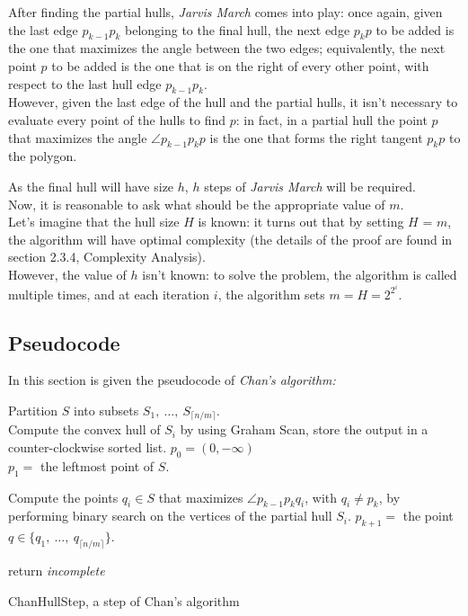 \documentclass[
12pt,
a4paper,
oneside,
headinclude,
footinclude]{report}
\theoremstyle{definition} %
\begin{document}
After finding the partial hulls, \textit{Jarvis March} comes into play:
once again, given the last edge $p_{k-1}p_k$ belonging to the final hull, the next edge $p_kp$ to be added is the one that maximizes the angle between the two edges; equivalently, the next point $p$ to be added is the one that is on the right of every other point, with respect to the last hull edge $p_{k-1}p_k$.\\
However, given the last edge of the hull and the partial hulls, it isn't necessary to evaluate every point of the hulls to find $p$: in fact, in a partial hull the point $p$ that maximizes the angle $\angle p_{k-1}p_kp$ is the one that forms the right tangent $p_kp$ to the polygon.

As the final hull will have size $h$, $h$ steps of \textit{Jarvis March} will be required.\\

Now, it is reasonable to ask what should be the appropriate value of $m$. \\
Let's imagine that the hull size $H$ is known: it turns out that by setting $H$ = $m$, the algorithm will have optimal complexity (the details of the proof are found in section 2.3.4, Complexity Analysis).\\ However, the value of $h$ isn't known: to solve the problem, the algorithm is called multiple times, and at each iteration $i$, the algorithm sets $m = H = 2^{2^i}$.


\subsection{Pseudocode}
In this section is given the pseudocode of \textit{Chan's algorithm:} \cite{Chan1996}\\


\begin{algorithm}[H]
	\DontPrintSemicolon
	\SetAlgoVlined
	Partition $S$ into subsets $S_1,\ \ldots,\ S_{\lceil n/m \rceil}$.\\
	{
		Compute the convex hull of $S_i$ by using Graham Scan, store the output in a counter-clockwise sorted list.
	}  
	$p_0 = (0, -\infty)$\\
	$p_1 =$ the leftmost point of $S$.
	
	{
		{
			Compute the points $q_i \in S$ that maximizes $\angle p_{k-1}p_kq_i$, with $q_i \ne p_k$, by performing binary search on the vertices of the partial hull $S_i$.
		}
		$p_{k+1} = $ the point $q \in \{q_1,\ \ldots,\ q_{\lceil n/m \rceil}\}$.\\
	}
	
	return \textit{incomplete}
	\caption{ChanHullStep, a step of Chan's algorithm}
\end{algorithm}
\end{document}
